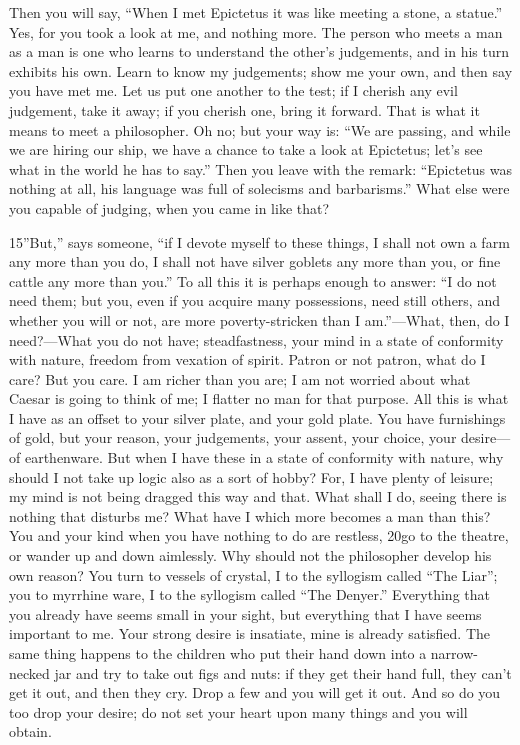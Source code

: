 Then you will say, ``When I met Epictetus it was like meeting a stone, a statue.'' Yes, for you took a look at me, and nothing more. The person who meets a man as a man is one who learns to understand the other's judgements, and in his turn exhibits his own. Learn to know my judgements; show me your own, and then say you have met me. Let us put one another to the test; if I cherish any evil judgement, take it away; if you cherish one, bring it forward. That is what it means to meet a philosopher. Oh no; but your way is: ``We are passing, and while we are hiring our ship, we have a chance to take a look at Epictetus; let's see what in the world he has to say.'' Then you leave with the remark: ``Epictetus was nothing at all, his language was full of solecisms and barbarisms.'' What else were you capable of judging, when you came in like that?

15''But,'' says someone, ``if I devote myself to these things, I shall not own a farm any more than you do, I shall not have silver goblets any more than you, or fine cattle any more than you.'' To all this it is perhaps enough to answer: ``I do not need them; but you, even if you acquire many possessions, need still others, and whether you will or not, are more poverty-stricken than I am.''—What, then, do I need?—What you do not have; steadfastness, your mind in a state of conformity with nature, freedom from vexation of spirit. Patron or not patron, what do I care? But you care. I am richer than you are; I am not worried about what Caesar is going to think of me; I flatter no man for that purpose. All this is what I have as an offset to your silver plate, and your gold plate. You have furnishings of gold, but your reason, your judgements, your assent, your choice, your desire—of earthenware. But when I have these in a state of conformity with nature, why should I not take up logic also as a sort of hobby? For, I have plenty of leisure; my mind is not being dragged this way and that. What shall I do, seeing there is nothing that disturbs me? What have I which more becomes a man than this? You and your kind when you have nothing to do are restless, 20go to the theatre, or wander up and down aimlessly. Why should not the philosopher develop his own reason? You turn to vessels of crystal, I to the syllogism called ``The Liar''; you to myrrhine ware, I to the syllogism called ``The Denyer.'' Everything that you already have seems small in your sight, but everything that I have seems important to me. Your strong desire is insatiate, mine is already satisfied. The same thing happens to the children who put their hand down into a narrow-necked jar and try to take out figs and nuts: if they get their hand full, they can't get it out, and then they cry. Drop a few and you will get it out. And so do you too drop your desire; do not set your heart upon many things and you will obtain.

